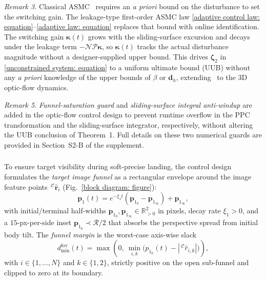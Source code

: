 \textit{Remark 3.} Classical ASMC~\cite{roy2020} requires an \emph{a priori} bound on the disturbance to set the switching gain. The leakage-type first-order ASMC law \eqref{adaptive control law: equation}--\eqref{adaptive law: equation} replaces that bound with online identification. The switching gain $\boldsymbol{\kappa}(t)$ grows with the sliding-surface excursion and decays under the leakage term $-\mathcal{N}\mathcal{P}\boldsymbol{\kappa}$, so $\boldsymbol{\kappa}(t)$ tracks the actual disturbance magnitude without a designer-supplied upper bound. This drives $\boldsymbol{\zeta}_2$ in \eqref{unconstrained system: equation} to a uniform ultimate bound (UUB) without any \emph{a priori} knowledge of the upper bounds of $\beta$ or $\boldsymbol{d}_h$, extending~\cite{singhal2025} to the 3D optic-flow dynamics.


\textit{Remark 5.} \emph{Funnel-saturation guard} and \emph{sliding-surface integral anti-windup} are added in the optic-flow control design to prevent runtime overflow in the PPC transformation and the sliding-surface integrator, respectively, without altering the UUB conclusion of Theorem~1. Full details on these two numerical guards are provided in Section~S2-B of the supplement.

\subsubsection{} \label{acceleration conditioning: section}
To ensure target visibility during soft-precise landing, the control design formulates the \emph{target image funnel} as a rectangular envelope around the image feature points $\,^\mathcal{C}\hat{\boldsymbol{r}}_i$ (Fig.~\ref{block diagram: figure}):
\begin{equation} \label{rho fov: equation}
    \boldsymbol{p}_1(t) = e^{-\xi_1 t}(\boldsymbol{p}_{1_0}-\boldsymbol{p}_{1_\infty}) + \boldsymbol{p}_{1_\infty},
\end{equation}
with initial/terminal half-widths $\boldsymbol{p}_{1_0},\boldsymbol{p}_{1_\infty}\in\mathbb{R}^2_{>0}$ in pixels, decay rate $\xi_1>0$, and a $15$-px-per-side inset $\boldsymbol{p}_{1_0}\prec\mathcal{R}/2$ that absorbs the perspective spread from initial body tilt. The \emph{funnel margin} is the worst-case axis-wise slack
\begin{equation} \label{d min fov: equation}
    d_\text{min}^\text{fov}(t) = \max\!\left(0,\ \min_{i,k}\!\big(p_{1_k}(t)-|\,^\mathcal{C}\hat{r}_{i,k}|\big)\right),
\end{equation}
with $i\in\{1,\ldots,N\}$ and $k\in\{1,2\}$, strictly positive on the open sub-funnel and clipped to zero at its boundary.

